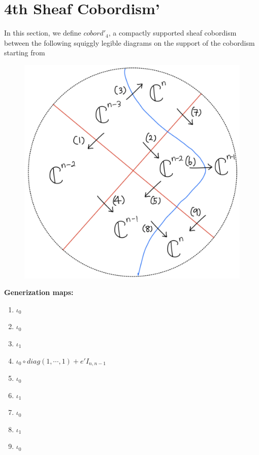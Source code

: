 \section{4th Sheaf Cobordism'}
In this section, we define $cobord'_4$, a compactly supported sheaf cobordism between the following squiggly legible diagrams on the support of the cobordism starting from
\begin{figure}[H]
    \centering
    \includegraphics[scale = 0.45]{diagrams/cobord'4/21.png}
    \caption{}
    \label{fig:your-label}
\end{figure}
\textbf{Generization maps:}
\begin{enumerate}[label = (\arabic*)]
\item $\iota_0$

\item $\iota_0$

\item $\iota_1$

\item $\iota_0 \circ diag(1,\cdots,1)+e'I_{n,n-1}$

\item $\iota_0$

\item $\iota_1$

\item $\iota_0$

\item $\iota_1$

\item $\iota_0$
\end{enumerate}

